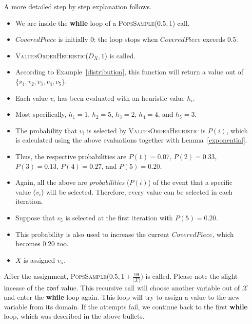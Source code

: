 \documentclass{ws-ijait}
\begin{document}
\begin{example}
  A more detailed step by step explanation follows.
  \begin{itemize}
    \item We are inside the \textbf{while} loop of a
          \textsc{PopsSample}($0.5, 1$) call.
    \item $\mathit{CoveredPiece}$ is initially $0$; the loop
          stops when $\mathit{CoveredPiece}$ exceeds $0.5$.
    \item \textsc{ValuesOrderHeuristic}($D_X, 1$) is called.
    \item According to Example~\ref{distribution}, this
          function will return a value out of $\{v_1, v_2,
          v_3, v_4, v_5\}$.
    \item Each value $v_i$ has been evaluated with an
          heuristic value $h_i$.
    \item Most specifically, $h_1 = 1$, $h_2 = 5$, $h_3 =
          2$, $h_4 = 4$, and $h_5 = 3$.
    \item The probability that $v_i$ is selected by
          \textsc{ValuesOrderHeuristic} is $P(i)$, which is
          calculated using the above evaluations together
          with Lemma~\ref{exponential}.
    \item Thus, the respective probabilities are $P(1) =
          0.07$, $P(2) = 0.33$, $P(3) = 0.13$, $P(4) =
          0.27$, and $P(5) = 0.20$.
    \item Again, all the above are \emph{probabilities}
          ($P(i)$) of the event that a specific value
          ($v_i$) will be selected. Therefore, every value
          can be selected in each iteration.
    \item Suppose that $v_5$ is selected at the first
          iteration with $P(5) = 0.20$.
    \item This probability is also used to increase the
          current $\mathit{CoveredPiece}$, which becomes
          $0.20$ too.
    \item $X$ is assigned $v_5$.
  \end{itemize}
  After the assignment, \textsc{PopsSample}($0.5, 1 +
  \frac{99}{|\mathscr{X}|}$) is called. Please note the
  slight incease of the $\mathsf{conf}$ value. This
  recursive call will choose another variable out of
  $\mathscr{X}$ and enter the \textbf{while} loop again.
  This loop will try to assign a value to the new variable
  from its domain. If the attempts fail, we continue back to
  the first \textbf{while} loop, which was described in the
  above bullets.
  \begin{itemize}

\end{itemize}
\end{example}
\end{document}
